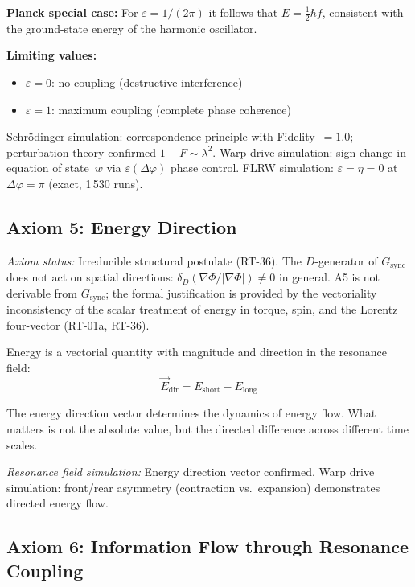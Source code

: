 \documentclass[12pt]{iopart}
\begin{document}
	\textbf{Planck special case:}
	For $\varepsilon = 1/(2\pi)$ it follows that
	$E = \frac{1}{2}\hbar f$, consistent with the
	ground-state energy of the harmonic oscillator.
	
	\textbf{Limiting values:}
	\begin{itemize}
		\item $\varepsilon = 0$: no coupling
		(destructive interference)
		\item $\varepsilon = 1$: maximum coupling
		(complete phase coherence)
	\end{itemize}
	
	Schrödinger simulation: correspondence principle with Fidelity~$= 1.0$;
	perturbation theory confirmed $1-F \sim \lambda^2$.
	Warp drive simulation: sign change in equation of state~$w$
	via $\varepsilon(\Delta\varphi)$ phase control.
	FLRW simulation: $\varepsilon = \eta = 0$ at $\Delta\varphi = \pi$
	(exact, 1\,530 runs).
	
	\subsection{Axiom 5: Energy Direction}
	
	\textit{Axiom status:} Irreducible structural postulate (RT-36).
	The $D$-generator of $G_{\mathrm{sync}}$ does not act on
	spatial directions: $\delta_D(\nabla\Phi/|\nabla\Phi|) \neq 0$
	in general. A5 is not derivable from $G_{\mathrm{sync}}$;
	the formal justification is provided by the vectoriality
	inconsistency of the scalar treatment of energy in torque,
	spin, and the Lorentz four-vector (RT-01a, RT-36).
	
	Energy is a vectorial quantity with magnitude and
	direction in the resonance field:
	\begin{equation}
		\vec{E}_{\mathrm{dir}} =
		E_{\mathrm{short}} - E_{\mathrm{long}}
		\label{eq:energy_direction}
	\end{equation}
	
	The energy direction vector determines the dynamics of
	energy flow. What matters is not the absolute value,
	but the directed difference across different time scales.
	
	\textit{Resonance field simulation:}
	Energy direction vector confirmed.
	Warp drive simulation: front/rear asymmetry
	(contraction vs.\ expansion) demonstrates directed energy flow.
	
	\subsection{Axiom 6: Information Flow through
		Resonance Coupling}
	
\end{document}
